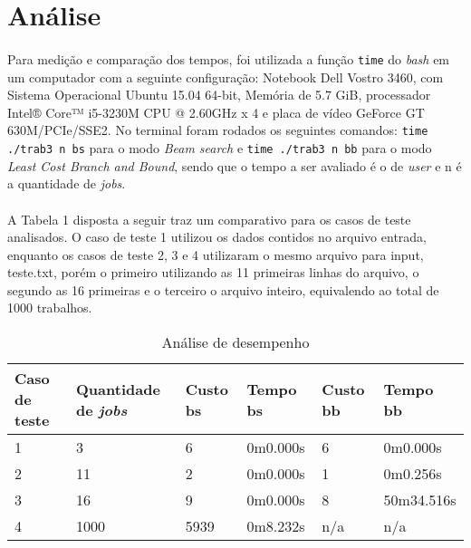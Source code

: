 \documentclass[12pt,a4paper]{article}
\begin{document}
 \newpage
 \section{Análise}	
  {\paragraph{} Para medição e comparação dos tempos, foi utilizada a função {\tt time} do {\it bash} em um computador com a seguinte configuração: Notebook Dell Vostro 3460, com Sistema Operacional Ubuntu 15.04 64-bit, Memória de 5.7 GiB, processador Intel® Core™ i5-3230M CPU @ 2.60GHz x 4 e placa de vídeo GeForce GT 630M/PCIe/SSE2. No terminal foram rodados os seguintes comandos: {\tt time ./trab3 n bs} para o modo {\it Beam search} e {\tt time ./trab3 n bb} para o modo {\it Least Cost Branch and Bound}, sendo que o tempo a ser avaliado é o de \emph{user} e n é a quantidade de {\it jobs}.}
  {\paragraph{} A Tabela 1 disposta a seguir traz um comparativo para os casos de teste analisados. O caso de teste 1 utilizou os dados contidos no arquivo entrada, enquanto os casos de teste 2, 3 e 4 utilizaram o mesmo arquivo para input, teste.txt, porém o primeiro utilizando as 11 primeiras linhas do arquivo, o segundo as 16 primeiras e o terceiro o arquivo inteiro, equivalendo ao total de 1000 trabalhos. }
  
\begin{table}[!h]
\centering
\caption{Análise de desempenho}
\label{my-label}
\begin{tabular}{|l|l|l|l|l|l|}
\hline
Caso de teste & Quantidade de {\it jobs} & Custo bs & Tempo bs & Custo bb & Tempo bb \\ \hline
1             & 3                          & 6                    & 0m0.000s            & 6                    & 0m0.000s            \\ \hline
2             & 11                         & 2                    & 0m0.000s            & 1                    & 0m0.256s            \\ \hline
3             & 16                         & 9                    & 0m0.000s            &                8     & 50m34.516s            \\ \hline
4             & 1000                         & 5939                    & 0m8.232s            &                    n/a & n/a            \\ \hline
\end{tabular}
\end{table}
\end{document}

